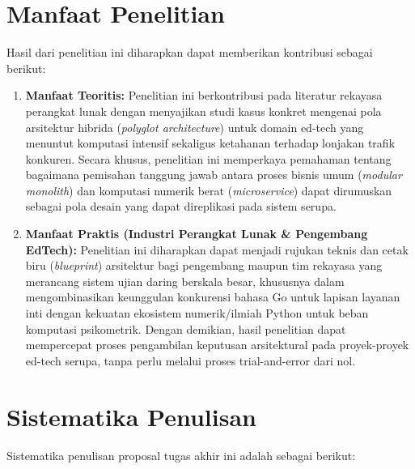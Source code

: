 \section{Manfaat Penelitian}

Hasil dari penelitian ini diharapkan dapat memberikan kontribusi sebagai berikut:

\begin{enumerate}
	\item \textbf{Manfaat Teoritis:} Penelitian ini berkontribusi pada literatur rekayasa perangkat lunak dengan menyajikan
  studi kasus konkret mengenai pola arsitektur hibrida (\textit{polyglot architecture}) untuk domain ed-tech yang 
  menuntut komputasi intensif sekaligus ketahanan terhadap lonjakan trafik konkuren. Secara khusus, penelitian ini 
  memperkaya pemahaman tentang bagaimana pemisahan tanggung jawab antara proses bisnis umum (\textit{modular monolith}) 
  dan komputasi numerik berat (\textit{microservice}) dapat dirumuskan sebagai pola desain yang dapat direplikasi pada 
  sistem serupa.

	\item \textbf{Manfaat Praktis (Industri Perangkat Lunak \& Pengembang EdTech):} Penelitian ini diharapkan dapat menjadi 
  rujukan teknis dan cetak biru (\textit{blueprint}) arsitektur bagi pengembang maupun tim rekayasa yang merancang sistem 
  ujian daring berskala besar, khususnya dalam mengombinasikan keunggulan konkurensi bahasa Go untuk lapisan layanan 
  inti dengan kekuatan ekosistem numerik/ilmiah Python untuk beban komputasi psikometrik. Dengan demikian, hasil penelitian 
  dapat mempercepat proses pengambilan keputusan arsitektural pada proyek-proyek ed-tech serupa, tanpa perlu melalui proses 
  trial-and-error dari nol.

\end{enumerate}


\section{Sistematika Penulisan}


Sistematika penulisan proposal tugas akhir ini adalah sebagai berikut:

